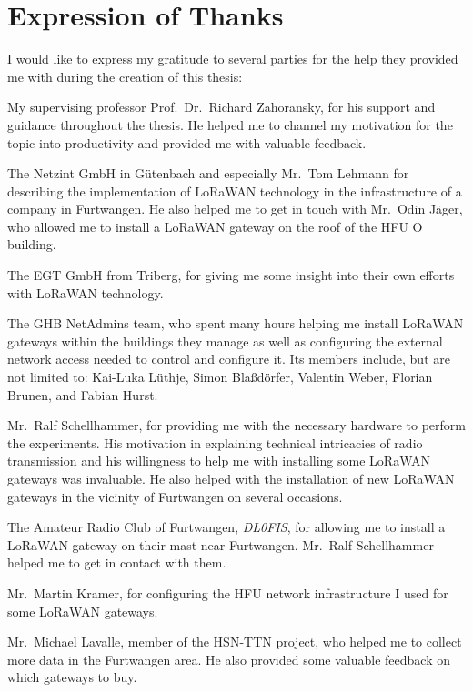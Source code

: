 
\section{Expression of Thanks}\label{sec:expression-of-thanks}

I would like to express my gratitude to several parties for the help they provided me with during the creation of this thesis:

My supervising professor Prof.\ Dr.\ Richard Zahoransky, for his support and guidance throughout the thesis.
He helped me to channel my motivation for the topic into productivity and provided me with valuable feedback.

The Netzint GmbH in Gütenbach and especially Mr.\ Tom Lehmann for describing the implementation of \ac{LoRaWAN} technology in the infrastructure of a company in Furtwangen.
He also helped me to get in touch with Mr.\ Odin Jäger, who allowed me to install a \ac{LoRaWAN} gateway on the roof of the \ac{HFU} O building.

The EGT GmbH from Triberg, for giving me some insight into their own efforts with \ac{LoRaWAN} technology.

The \ac{GHB} NetAdmins team, who spent many hours helping me install \ac{LoRaWAN} gateways within the buildings they manage as well as configuring the external network access needed to control and configure it.
Its members include, but are not limited to: Kai-Luka Lüthje, Simon Blaßdörfer, Valentin Weber, Florian Brunen, and Fabian Hurst.

Mr.\ Ralf Schellhammer, for providing me with the necessary hardware to perform the experiments.
His motivation in explaining technical intricacies of radio transmission and his willingness to help me with installing some \ac{LoRaWAN} gateways was invaluable.
He also helped with the installation of new \ac{LoRaWAN} gateways in the vicinity of Furtwangen on several occasions.

The Amateur Radio Club of Furtwangen, \emph{DL0FIS}, for allowing me to install a \ac{LoRaWAN} gateway on their mast near Furtwangen.
Mr.\ Ralf Schellhammer helped me to get in contact with them.

Mr.\ Martin Kramer, for configuring the \ac{HFU} network infrastructure I used for some \ac{LoRaWAN} gateways.

Mr.\ Michael Lavalle, member of the \ac{HSN-TTN} project, who helped me to collect more data in the Furtwangen area.
He also provided some valuable feedback on which gateways to buy.

